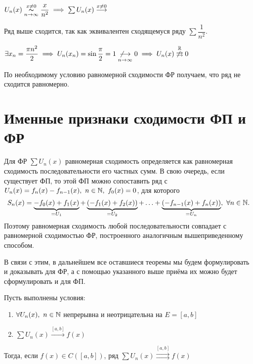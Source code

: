 \documentclass[../../main.tex]{subfiles}
\begin{document}
\begin{exmps}
\begin{enumerate}
	$U_n(x) \overset{x \neq 0}{\underset{n \to \infty}\thicksim} 
	\dfrac{x}{n^2} \implies \sum U_n(x) \overset{x \neq 0}{\longrightarrow}$
	
	Ряд выше сходится, так как эквивалентен сходящемуся ряду $\sum \dfrac 1{n^2}$.
	
	$\exists x_n = \dfrac{\pi n^2}{2} \implies U_n(x_n) = 
	\sin\dfrac{\pi}{2} = 1 \underset{n \to \infty}
	{\not \longrightarrow} 0 \implies
	U_n(x) \overset{\mathbb{R}}{\not \rightrightarrows} 0$

	По необходимому условию равномерной сходимости ФР получаем, что ряд 
	не сходится равномерно.
	\end{enumerate}	
\end{exmps}	

\section{Именные признаки сходимости ФП и ФР}

Для ФР $\sum U_n(x)$ равномерная сходимость определяется как 
равномерная сходимость последовательности его частных сумм. В свою очередь,
если существует ФП, то этой ФП можно сопоставить ряд с 
$U_n(x) = f_n(x) - f_{n-1}(x),\ n \in \mathbb{N},\ f_0(x) = 0$, для которого
\[
S_n(x) = \underbrace{-f_0(x) + f_1(x)}_{= U_1} + 
\underbrace{(-f_1(x) + f_2(x))}_{= U_2} + \ldots +
\underbrace{(-f_{n-1}(x) + f_n(x))}_{= U_n},\ \forall n \in \mathbb{N}.	
\]
Поэтому равномерная сходимость любой последовательности совпадает с 
равномерной сходимостью ФР, построенного аналогичным вышеприведенному
способом.

В связи с этим, в дальнейшем все оставшиеся теоремы мы будем формулировать
и доказывать для ФР, а с помощью указанного выше приёма их можно будет
сформулировать и для ФП.

\begin{thm}
Пусть выполнены условия:

	\begin{enumerate}
		\item $\forall U_n(x),\ n \in \mathbb{N}$ непрерывна и неотрицательна на
	$E=[a,b]$
		\item $\sum U_n(x) \overset{[a,b]}{\longrightarrow} f(x)$
	\end{enumerate}
Тогда, если $f(x) \in C([a,b])$, ряд 
$\sum U_n(x) \overset{[a,b]}{\rightrightarrows} f(x)$
\end{thm}	
\end{document}
